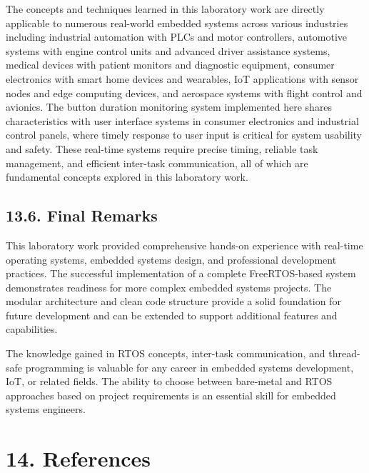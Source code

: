 \documentclass[12pt]{article}
\begin{document}
The concepts and techniques learned in this laboratory work are directly applicable to numerous real-world embedded systems across various industries including industrial automation with PLCs and motor controllers, automotive systems with engine control units and advanced driver assistance systems, medical devices with patient monitors and diagnostic equipment, consumer electronics with smart home devices and wearables, IoT applications with sensor nodes and edge computing devices, and aerospace systems with flight control and avionics. The button duration monitoring system implemented here shares characteristics with user interface systems in consumer electronics and industrial control panels, where timely response to user input is critical for system usability and safety. These real-time systems require precise timing, reliable task management, and efficient inter-task communication, all of which are fundamental concepts explored in this laboratory work.

\subsection*{13.6. Final Remarks}

This laboratory work provided comprehensive hands-on experience with real-time operating systems, embedded systems design, and professional development practices. The successful implementation of a complete FreeRTOS-based system demonstrates readiness for more complex embedded systems projects. The modular architecture and clean code structure provide a solid foundation for future development and can be extended to support additional features and capabilities.

The knowledge gained in RTOS concepts, inter-task communication, and thread-safe programming is valuable for any career in embedded systems development, IoT, or related fields. The ability to choose between bare-metal and RTOS approaches based on project requirements is an essential skill for embedded systems engineers.

\section*{14. References}
\end{document}
